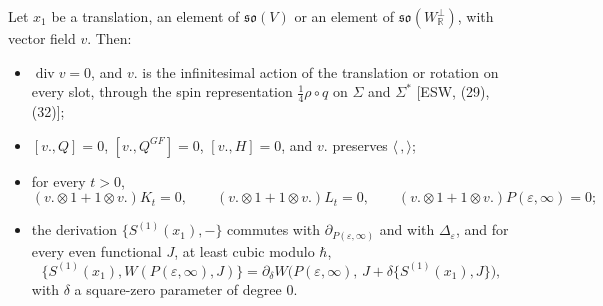 \begin{proposition}
\label{prop:c7-cov}
Let $x_1$ be a translation, an element of $\mathfrak{so}(V)$ or an element of $\mathfrak{so}(W_{\mathbb R}^\perp)$, with vector field $v$. Then:
\begin{itemize}
\item $\operatorname{div}v=0$, and $v.$ is the infinitesimal action of the translation or rotation on every slot, through the spin representation $\tfrac14\rho\circ q$ on $\Sigma$ and $\Sigma^*$ [ESW, (29), (32)];
\item $[v.,Q]=0$, $[v.,Q^{GF}]=0$, $[v.,H]=0$, and $v.$ preserves $\langle\,,\rangle$;
\item for every $t>0$,
\[
(v.\otimes1+1\otimes v.)K_t=0,\qquad (v.\otimes1+1\otimes v.)L_t=0,\qquad (v.\otimes1+1\otimes v.)P(\varepsilon,\infty)=0;
\]
\item the derivation $\{S^{(1)}(x_1),-\}$ commutes with $\partial_{P(\varepsilon,\infty)}$ and with $\Delta_\varepsilon$, and for every even functional $J$, at least cubic modulo $\hbar$,
\begin{equation}
\{S^{(1)}(x_1),W(P(\varepsilon,\infty),J)\}=\partial_\delta W\big(P(\varepsilon,\infty),\,J+\delta\{S^{(1)}(x_1),J\}\big),
\label{eq:c7-flowcov}
\end{equation}
with $\delta$ a square-zero parameter of degree $0$.
\end{itemize}
\end{proposition}

